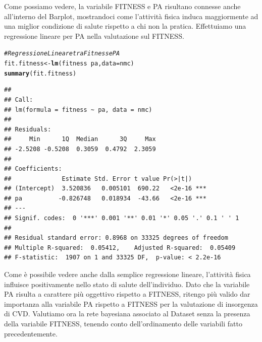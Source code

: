 \documentclass{article}\usepackage[]{graphicx}\usepackage[]{xcolor}
\makeatletter
\newcommand{\hlcom}[1]{\textcolor[rgb]{0.678,0.584,0.686}{\textit{#1}}}%
\newcommand{\hlopt}[1]{\textcolor[rgb]{0,0,0}{#1}}%
\newcommand{\hlstd}[1]{\textcolor[rgb]{0.345,0.345,0.345}{#1}}%
\newcommand{\hlkwb}[1]{\textcolor[rgb]{0.69,0.353,0.396}{#1}}%
\newcommand{\hlkwc}[1]{\textcolor[rgb]{0.333,0.667,0.333}{#1}}%
\newcommand{\hlkwd}[1]{\textcolor[rgb]{0.737,0.353,0.396}{\textbf{#1}}}%
\newenvironment{kframe}{%
 \def\at@end@of@kframe{}%
 \ifinner\ifhmode%
  \def\at@end@of@kframe{\end{minipage}}%
  \begin{minipage}{\columnwidth}%
 \fi\fi%
 \def\FrameCommand##1{\hskip\@totalleftmargin \hskip-\fboxsep
 \colorbox{shadecolor}{##1}\hskip-\fboxsep
     \hskip-\linewidth \hskip-\@totalleftmargin \hskip\columnwidth}%
 \MakeFramed {\advance\hsize-\width
   \@totalleftmargin\z@ \linewidth\hsize
   \@setminipage}}%
 {\par\unskip\endMakeFramed%
 \at@end@of@kframe}
\newenvironment{knitrout}{}{} %
\makeatother
\begin{document}
    Come possiamo vedere, la variabile FITNESS e PA risultano connesse anche 
    all'interno del Barplot, mostrandoci come l'attività fisica induca
    maggiormente ad una miglior condizione di salute rispetto a chi non la
    pratica.
    Effettuiamo una regressione lineare per PA nella valutazione sul FITNESS.
    
\begin{knitrout}
\color{fgcolor}\begin{kframe}
\begin{alltt}
\hlcom{#Regressione Lineare tra Fitness e PA}
\hlstd{fit.fitness} \hlkwb{<-} \hlkwd{lm}\hlstd{(fitness}\hlopt{~}\hlstd{pa,} \hlkwc{data}\hlstd{=nmc)}
\hlkwd{summary}\hlstd{(fit.fitness)}
\end{alltt}
\begin{verbatim}
## 
## Call:
## lm(formula = fitness ~ pa, data = nmc)
## 
## Residuals:
##     Min      1Q  Median      3Q     Max 
## -2.5208 -0.5208  0.3059  0.4792  2.3059 
## 
## Coefficients:
##              Estimate Std. Error t value Pr(>|t|)    
## (Intercept)  3.520836   0.005101  690.22   <2e-16 ***
## pa          -0.826748   0.018934  -43.66   <2e-16 ***
## ---
## Signif. codes:  0 '***' 0.001 '**' 0.01 '*' 0.05 '.' 0.1 ' ' 1
## 
## Residual standard error: 0.8968 on 33325 degrees of freedom
## Multiple R-squared:  0.05412,	Adjusted R-squared:  0.05409 
## F-statistic:  1907 on 1 and 33325 DF,  p-value: < 2.2e-16
\end{verbatim}
\end{kframe}
\end{knitrout}
    
    Come è possibile vedere anche dalla semplice regressione lineare, l'attività
    fisica influisce positivamente nello stato di salute dell'individuo.
    Dato che la variabile PA risulta a carattere più oggettivo rispetto a FITNESS,
    ritengo più valido dar importanza alla variabile PA rispetto a FITNESS per la
    valutazione di insorgenza di CVD.
    Valutiamo ora la rete bayesiana associato al Dataset senza la presenza della
    variabile FITNESS, tenendo conto dell'ordinamento delle variabili fatto
    precedentemente.
    
\end{document}
